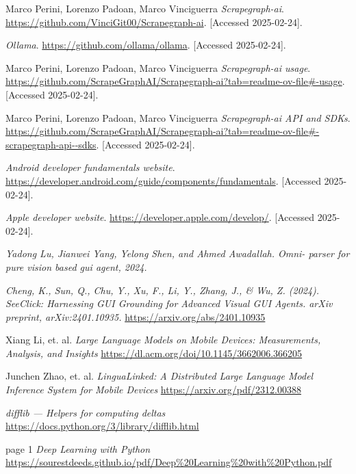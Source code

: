 \documentclass[licencjacka,en]{pracamgr}
\begin{document}
\begin{thebibliography}{99}
    Marco Perini, Lorenzo Padoan, Marco Vinciguerra
    \textit{Scrapegraph-ai}.
    \url{https://github.com/VinciGit00/Scrapegraph-ai}.
    [Accessed 2025-02-24].

    \textit{Ollama}.
    \url{https://github.com/ollama/ollama}.
    [Accessed 2025-02-24].

    Marco Perini, Lorenzo Padoan, Marco Vinciguerra
    \textit{Scrapegraph-ai usage}.
    \url{https://github.com/ScrapeGraphAI/Scrapegraph-ai?tab=readme-ov-file#-usage}.
    [Accessed 2025-02-24].

    Marco Perini, Lorenzo Padoan, Marco Vinciguerra
    \textit{Scrapegraph-ai API and SDKs}.
    \url{https://github.com/ScrapeGraphAI/Scrapegraph-ai?tab=readme-ov-file#-scrapegraph-api--sdks}.
    [Accessed 2025-02-24].

    \textit{Android developer fundamentals website}.
    \url{https://developer.android.com/guide/components/fundamentals}.
    [Accessed 2025-02-24].

    \textit{Apple developer website}.
    \url{https://developer.apple.com/develop/}.
    [Accessed 2025-02-24].

    \textit{Yadong Lu, Jianwei Yang, Yelong Shen, and Ahmed Awadallah. Omni-
    parser for pure vision based gui agent, 2024.}

    \textit{Cheng, K., Sun, Q., Chu, Y., Xu, F., Li, Y., Zhang, J., \& Wu, Z. (2024). SeeClick: Harnessing GUI Grounding for Advanced Visual GUI Agents. arXiv preprint, arXiv:2401.10935.} \url{https://arxiv.org/abs/2401.10935}

    Xiang Li, et. al.
    \textit{Large Language Models on Mobile Devices: Measurements, Analysis, and Insights}
    \url{https://dl.acm.org/doi/10.1145/3662006.366205}

    Junchen Zhao, et. al.
    \textit{LinguaLinked: A Distributed Large Language Model Inference System for Mobile Devices}
    \url{https://arxiv.org/pdf/2312.00388}

    \textit{difflib — Helpers for computing deltas}
    \url{https://docs.python.org/3/library/difflib.html}

    page 1
    \textit{Deep Learning with Python}
    \url{https://sourestdeeds.github.io/pdf/Deep%20Learning%20with%20Python.pdf}


\end{thebibliography}
\end{document}
